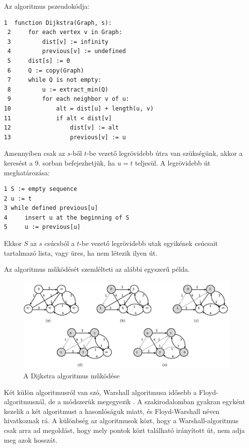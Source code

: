Az algoritmus pszeudokódja:

\begin{verbatim}
1  function Dijkstra(Graph, s):
 2     for each vertex v in Graph:     
 3         dist[v] := infinity         
 4         previous[v] := undefined
 5     dist[s] := 0                    
 6     Q := copy(Graph)                
 7     while Q is not empty:
 8         u := extract_min(Q)        
 9         for each neighbor v of u:
10             alt = dist[u] + length(u, v)
11             if alt < dist[v]       
12                 dist[v] := alt      
13                 previous[v] := u
\end{verbatim}

Amennyiben csak az $s$-ből $t$-be vezető legrövidebb útra van szükségünk, akkor a keresést a 9. sorban befejezhetjük, ha $u = t$ teljesül. A legrövidebb út meghatározása:

\begin{verbatim}
1 S := empty sequence
2 u := t
3 while defined previous[u]
4     insert u at the beginning of S
5     u := previous[u]
\end{verbatim}

Ekkor $S$ az $s$ csúcsból a $t$-be vezető legrövidebb utak egyikének csúcsait tartalmazó lista, vagy üres, ha nem létezik ilyen út.

Az algoritmus működését szemlélteti az alábbi egyszerű példa.

\begin{figure}[htb]
\centering
\includegraphics[scale=0.5]{kepek/dijkstra.jpg}
\caption{A Dijkstra algoritmus működése}
\label{fig:dijkstra}
\end{figure}


Két külön algoritmusról van szó, Warshall algoritmusa idősebb a Floyd-algoritmusnál, de a módszerük megegyezik \cite{floyd-warshall}. A szakirodalomban gyakran egyként kezelik a két algoritmust a hasonlóságuk miatt, és Floyd-Warshall néven hivatkoznak rá.
A különbség az algoritmusok közt, hogy a Warshall-algoritmus csak arra ad megoldást, hogy mely pontok közt található irányított út, nem adja meg azok hosszát.

